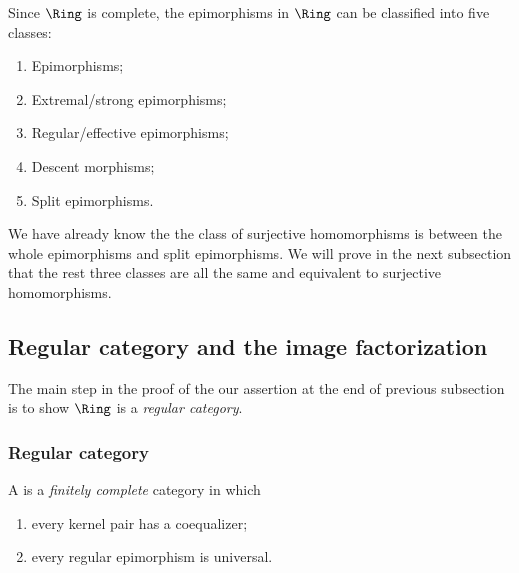   Since $\Ring$ is complete, the epimorphisms in $\Ring$ can be classified into five classes:
  \begin{enumerate}
    \item Epimorphisms;
    \item Extremal/strong epimorphisms;
    \item Regular/effective epimorphisms;
    \item Descent morphisms;
    \item Split epimorphisms.
  \end{enumerate}

  We have already know the the class of surjective homomorphisms is between the whole epimorphisms and split epimorphisms. We will prove in the next subsection that the rest three classes are all the same and equivalent to surjective homomorphisms.

\subsection{Regular category and the image factorization}
  The main step in the proof of the our assertion at the end of previous subsection is to show $\Ring$ is a \emph{regular category}.

\subsubsection{Regular category}
  A  is a \emph{finitely complete} category in which
  \begin{enumerate}
    \item every kernel pair has a coequalizer;
    \item every regular epimorphism is universal.
  \end{enumerate}

